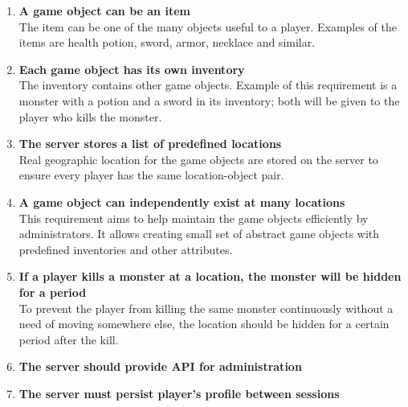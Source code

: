 \begin{enumerate}
			\item \textbf{A game object can be an item} \\	
			The item can be one of the many objects useful to a player. Examples of the items are health potion, sword, armor, necklace and similar.
			
			\item \textbf{Each game object has its own inventory} \\
			The inventory contains other game objects. Example of this requirement is a monster with a potion and a sword in its inventory; both will be given to the player who kills the monster.  
			
			\item \textbf{The server stores a list of predefined locations} \\	
			Real geographic location for the game objects are stored on the server to ensure every player has the same location-object pair. 
								
			\item \textbf{A game object can independently exist at many locations} \\
			This requirement aims to help maintain the game objects efficiently by administrators. It allows creating small set of abstract game objects with predefined inventories and other attributes. 
			
			\item \textbf{If a player kills a monster at a location, the monster will be hidden for a period} \\
			To prevent the player from killing the same monster continuously without a need of moving somewhere else, the location should be hidden for a certain period after the kill.
			
			\item \textbf{The server should provide API for administration} \\	
			
					
			\item \textbf{The server must persist player’s profile between sessions} \\
		\end{enumerate}
